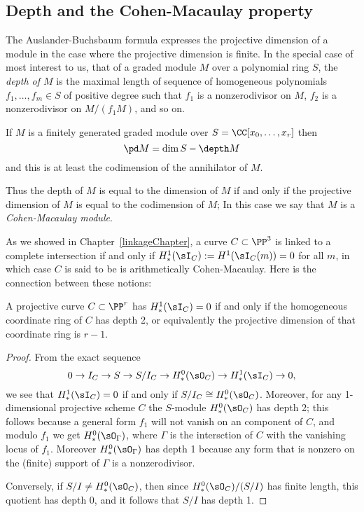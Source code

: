 \subsection{Depth and the Cohen-Macaulay property}
The Auslander-Buchsbaum formula expresses the projective dimension of a module in the case where the projective dimension is finite. In the special case of most interest to us, that of a graded module $M$ over a polynomial ring
$S$, the \emph{depth of $M$} is the maximal length of sequence of homogeneous polynomials $f_1,\dots,f_m \in S$ of positive degree such that $f_1$ is a nonzerodivisor on $M$, $f_2$ is a nonzerodivisor on $M/(f_1M)$, and so on.

\begin{theorem}\label{AB formula}
If $M$ is a finitely generated graded module over $S = \CC[x_0,\dots, x_r]$ then
$$
\pd M = \dim S - \depth M
$$
and this is at least the codimension of the annihilator of $M$.
\end{theorem}

Thus the depth of $M$ is equal to the dimension of $M$ if and only if the projective dimension
of $M$ is equal to the codimension of $M$; In this case we say that $M$ is a
\emph{Cohen-Macaulay module}.

As we showed in Chapter~\ref{linkageChapter}, a curve $C\subset \PP^3$ is linked to a complete intersection
if and only if  $H^1_*(\sI_C) := H^1(\sI_C(m)) = 0$ for all $m$, in which case $C$ is said to be is arithmetically Cohen-Macaulay. Here is the connection between these notions: 

\begin{proposition}\label{meaning of ACM}
A projective curve $C \subset \PP^r$  has $H^1_*(\sI_C) = 0$ if and only if the homogeneous coordinate ring of $C$
has depth 2, or equivalently the projective dimension of that coordinate ring is $r-1$.
\end{proposition}

\begin{proof}
 From the exact sequence
$$
0\to I_C \to S \to S/I_C \to  H^0_*( \sO_C) \to H^1_*(\sI_C) \to 0,
$$
we see that $H^1_*(\sI_C) = 0$ if and only if $S/I_C\cong H^0_*(\sO_C)$.  
Moreover, for any 1-dimensional projective scheme $C$ the $S$-module $H^0_*(\sO_C)$ has depth 2; this follows because
a general form $f_1$ will not vanish on an component of $C$, and modulo $f_1$ we get $H^0_*(\sO_\Gamma)$, where $\Gamma$ is the intersction of $C$ with the vanishing locus of $f_1$. Moreover  $H^0_*(\sO_\Gamma)$ has depth
1 because any form that is nonzero on the (finite) support of $\Gamma$ is a nonzerodivisor.

Conversely, if $S/I\neq H^0_*( \sO_C)$, then since $H^0_*( \sO_C)/(S/I)$ has finite length, this quotient has depth 0,
and it follows that $S/I$ has depth 1.
\end{proof}

